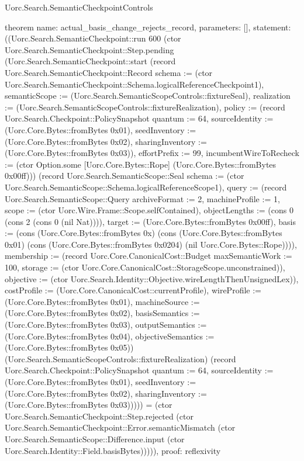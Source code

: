 \begin{lexlean}{Uorc.Search.SemanticCheckpointControls}
\begin{semanticmodule}
theorem{
  name: actual_basis_change_rejects_record,
  parameters: [],
  statement: ((Uorc.Search.SemanticCheckpoint::run 600 (ctor Uorc.Search.SemanticCheckpoint::Step.pending (Uorc.Search.SemanticCheckpoint::start (record Uorc.Search.SemanticCheckpoint::Record {schema := (ctor Uorc.Search.SemanticCheckpoint::Schema.logicalReferenceCheckpoint1), semanticScope := (Uorc.Search.SemanticScopeControls::fixtureSeal), realization := (Uorc.Search.SemanticScopeControls::fixtureRealization), policy := (record Uorc.Search.Checkpoint::PolicySnapshot {quantum := 64, sourceIdentity := (Uorc.Core.Bytes::fromBytes 0x01), seedInventory := (Uorc.Core.Bytes::fromBytes 0x02), sharingInventory := (Uorc.Core.Bytes::fromBytes 0x03)}), effortPrefix := 99, incumbentWireToRecheck := (ctor Option.some [Uorc.Core.Bytes::Rope] (Uorc.Core.Bytes::fromBytes 0x00ff))}) (record Uorc.Search.SemanticScope::Seal {schema := (ctor Uorc.Search.SemanticScope::Schema.logicalReferenceScope1), query := (record Uorc.Search.SemanticScope::Query {archiveFormat := 2, machineProfile := 1, scope := (ctor Uorc.Wire.Frame::Scope.selfContained), objectLengths := (cons 0 (cons 2 (cons 0 (nil Nat)))), target := (Uorc.Core.Bytes::fromBytes 0x00ff), basis := (cons (Uorc.Core.Bytes::fromBytes 0x) (cons (Uorc.Core.Bytes::fromBytes 0x01) (cons (Uorc.Core.Bytes::fromBytes 0x0204) (nil Uorc.Core.Bytes::Rope)))), membership := (record Uorc.Core.CanonicalCost::Budget {maxSemanticWork := 100, storage := (ctor Uorc.Core.CanonicalCost::StorageScope.unconstrained)}), objective := (ctor Uorc.Search.Identity::Objective.wireLengthThenUnsignedLex)}), costProfile := (Uorc.Core.CanonicalCost::currentProfile), wireProfile := (Uorc.Core.Bytes::fromBytes 0x01), machineSource := (Uorc.Core.Bytes::fromBytes 0x02), basisSemantics := (Uorc.Core.Bytes::fromBytes 0x03), outputSemantics := (Uorc.Core.Bytes::fromBytes 0x04), objectiveSemantics := (Uorc.Core.Bytes::fromBytes 0x05)}) (Uorc.Search.SemanticScopeControls::fixtureRealization) (record Uorc.Search.Checkpoint::PolicySnapshot {quantum := 64, sourceIdentity := (Uorc.Core.Bytes::fromBytes 0x01), seedInventory := (Uorc.Core.Bytes::fromBytes 0x02), sharingInventory := (Uorc.Core.Bytes::fromBytes 0x03)})))) = (ctor Uorc.Search.SemanticCheckpoint::Step.rejected (ctor Uorc.Search.SemanticCheckpoint::Error.semanticMismatch (ctor Uorc.Search.SemanticScope::Difference.input (ctor Uorc.Search.Identity::Field.basisBytes))))),
  proof: reflexivity{}
}


\end{semanticmodule}
\end{lexlean}
